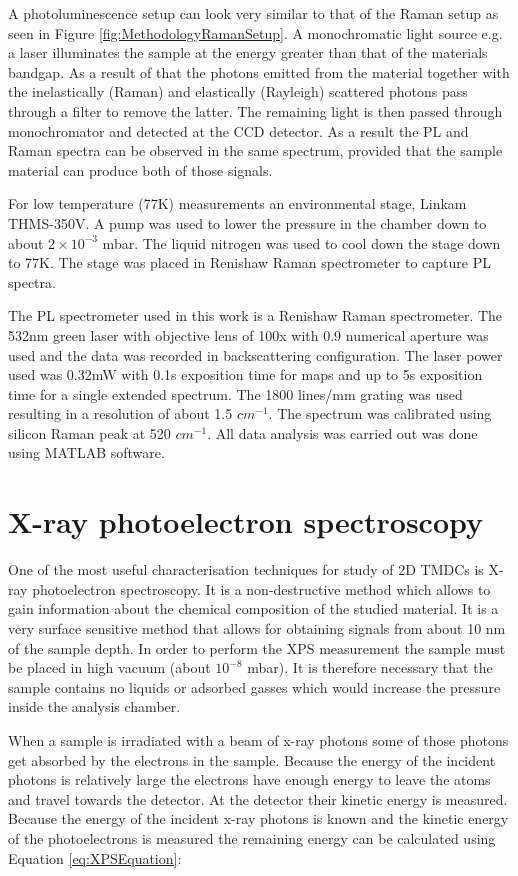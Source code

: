 A photoluminescence setup can look very similar to that of the Raman setup as seen in Figure \ref{fig:MethodologyRamanSetup}. A monochromatic light source e.g. a laser illuminates the sample at the energy greater than that of the materials bandgap. As a result of that the photons emitted from the material together with the inelastically (Raman) and elastically (Rayleigh) scattered photons pass through a filter to remove the latter. The remaining light is then passed through monochromator and detected at the CCD detector. As a result the PL and Raman spectra can be observed in the same spectrum, provided that the sample material can produce both of those signals. 

For low temperature (77K) measurements an environmental stage, Linkam THMS-350V. A pump was used to lower the pressure in the chamber down to about $2 \times 10^{-3}$ mbar. The liquid nitrogen was used to cool down the stage down to 77K. The stage was placed in Renishaw Raman spectrometer to capture PL spectra.

The PL spectrometer used in this work is a Renishaw Raman spectrometer. The 532nm green laser with objective lens of 100x with 0.9 numerical aperture was used and the data was recorded in backscattering configuration. The laser power used was 0.32mW with 0.1s exposition time for maps and up to 5s exposition time for a single extended spectrum. The 1800 lines/mm grating was used resulting in a resolution of about 1.5 $cm^{-1}$. The spectrum was calibrated using silicon Raman peak at 520 $cm^{-1}$. All data analysis was carried out was done using MATLAB software.

\section{X-ray photoelectron spectroscopy}

One of the most useful characterisation techniques for study of 2D TMDCs is X-ray photoelectron spectroscopy. It is a non-destructive method which allows to gain information about the chemical composition of the studied material. It is a very surface sensitive method that allows for obtaining signals from about 10 nm of the sample depth. In order to perform the XPS measurement the sample must be placed in high vacuum (about $10^{-8}$ mbar). It is therefore necessary that the sample contains no liquids or adsorbed gasses which would increase the pressure inside the analysis chamber. 

When a sample is irradiated with a beam of x-ray photons some of those photons get absorbed by the electrons in the sample. Because the energy of the incident photons is relatively large the electrons have enough energy to leave the atoms and travel towards the detector. At the detector their kinetic energy is measured. Because the energy of the incident x-ray photons is known and the kinetic energy of the photoelectrons is measured the remaining energy can be calculated using Equation \ref{eq:XPSEquation}:

